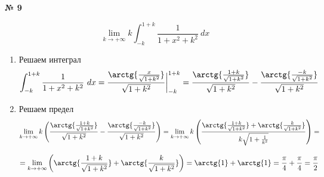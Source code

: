 \documentclass{article}
\begin{document}
\textbf{№ 9}
\Large

$$ \lim\limits_{k \to +\infty} k \int_{-k}^{1+k} \frac{1}{1+x^2+k^2} \ dx $$

\begin{enumerate}
\item Решаем интеграл
$$ \int_{-k}^{1+k} \frac{1}{1+x^2+k^2} \ dx
= \frac{\arctg{\frac{x}{\sqrt{1+k^2}}}}{\sqrt{1+k^2}} \bigg\vert_{-k}^{1+k} 
= \frac{\arctg{\frac{1+k}{\sqrt{1+k^2}}}}{\sqrt{1+k^2}} - \frac{\arctg{\frac{-k}{\sqrt{1+k^2}}}}{\sqrt{1+k^2}} $$

\item Решаем предел
$$ \lim\limits_{k \to +\infty} k \left( \frac{\arctg{\frac{1+k}{\sqrt{1+k^2}}}}{\sqrt{1+k^2}} - \frac{\arctg{\frac{-k}{\sqrt{1+k^2}}}}{\sqrt{1+k^2}} \right) 
= \lim\limits_{k \to +\infty} k \left( \frac{\arctg{\frac{1+k}{\sqrt{1+k^2}}} + \arctg{\frac{k}{\sqrt{1+k^2}}}}{k\sqrt{1+\frac{1}{k^2}}} \right) 
= $$

$$ =  \lim\limits_{k \to +\infty} \left( \arctg{\frac{1+k}{\sqrt{1+k^2}}} + \arctg{\frac{k}{\sqrt{1+k^2}}} \right) 
= \arctg{1} + \arctg{1} 
= \frac{\pi}{4} + \frac{\pi}{4}
= \frac{\pi}{2} $$

\end{enumerate}
\end{document}
